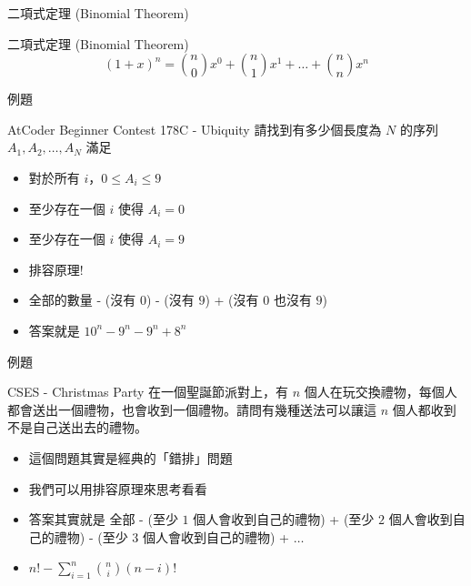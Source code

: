 \documentclass[aspectratio=169]{beamer}
\begin{document}
\begin{frame}{二項式定理 (Binomial Theorem)}
    \begin{alertblock}{二項式定理 (Binomial Theorem)}
        $$(1+x)^n = \binom{n}{0}x^0 + \binom{n}{1}x^1+ \dots + \binom{n}{n}x^n$$
    \end{alertblock}
\end{frame}

\begin{frame}{例題}
    \begin{block}{AtCoder Beginner Contest 178C - Ubiquity}
        請找到有多少個長度為 $N$ 的序列 $A_1,A_2,\dots,A_N$ 滿足
        \begin{itemize}
            \item 對於所有 $i$，$0 \le A_i \le 9$
            \item 至少存在一個 $i$ 使得 $A_i = 0$
            \item 至少存在一個 $i$ 使得 $A_i = 9$
        \end{itemize}
    \end{block} 
    \begin{itemize}
        \item 排容原理!
        \item 全部的數量 - (沒有 $0$) - (沒有 $9$) + (沒有 $0$ 也沒有 $9$)
        \item 答案就是 $10^n - 9^n - 9^n + 8^n$
    \end{itemize}
\end{frame}

\begin{frame}{例題}
    \begin{block}{CSES - Christmas Party}
        在一個聖誕節派對上，有 $n$ 個人在玩交換禮物，每個人都會送出一個禮物，也會收到一個禮物。請問有幾種送法可以讓這 $n$ 個人都收到不是自己送出去的禮物。
    \end{block}
    \begin{itemize}
        \item<1-> 這個問題其實是經典的「錯排」問題
        \item<2-> 我們可以用排容原理來思考看看
        \item<3-> 答案其實就是 全部 - (至少 $1$ 個人會收到自己的禮物) + (至少 $2$ 個人會收到自己的禮物) - (至少 $3$ 個人會收到自己的禮物) + $\ldots$
        \item<3-> $n! - \sum_{i=1}^n \binom{n}{i} (n-i)!$
    \end{itemize}
\end{frame}
\end{document}
